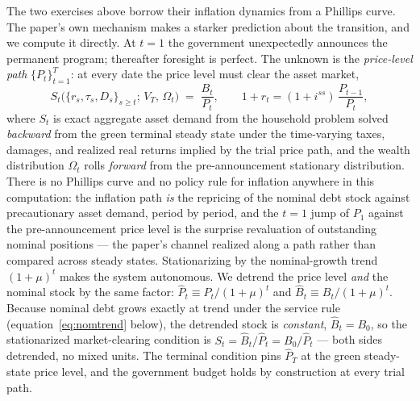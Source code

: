 \documentclass[12pt]{article}
\newcommand{\Sfun}{S}
\begin{document}
The two exercises above borrow their inflation dynamics from a Phillips
curve. The paper's own mechanism makes a starker prediction about the
transition, and we compute it directly. At $t=1$ the government unexpectedly announces
the permanent program; thereafter foresight is perfect. The unknown is
the \emph{price-level path} $\{P_t\}_{t=1}^{T}$: at every date the price
level must clear the asset market,
\[
S_t\bigl(\{r_s, \tau_s, D_s\}_{s \ge t};\, V_T,\, \Omega_t\bigr)
\;=\; \frac{B_t}{P_t}, \qquad
1 + r_t = (1+i^{ss})\,\frac{P_{t-1}}{P_t},
\]
where $S_t$ is exact aggregate asset demand from the household problem
solved \emph{backward} from the green terminal steady state under the
time-varying taxes, damages, and realized real returns implied by the
trial price path, and the wealth distribution $\Omega_t$ rolls
\emph{forward} from the pre-announcement stationary distribution. There
is no Phillips curve and no policy rule for inflation anywhere in this
computation: the inflation path \emph{is} the repricing of the nominal
debt stock against precautionary asset demand, period by period, and the
$t=1$ jump of $P_1$ against the pre-announcement price level is the
surprise revaluation of outstanding nominal positions --- the paper's
channel realized along a path rather than compared across steady states.
Stationarizing by the nominal-growth trend $(1+\mu)^t$ makes the system
autonomous. We detrend the price level \emph{and} the nominal stock by the
same factor: $\hat P_t\equiv P_t/(1+\mu)^t$ and $\hat B_t\equiv
B_t/(1+\mu)^t$. Because nominal debt grows exactly at trend under the service
rule (equation~\eqref{eq:nomtrend} below), the detrended stock is
\emph{constant}, $\hat B_t=B_0$, so the stationarized market-clearing condition
is $\Sfun_t=\hat B_t/\hat P_t=B_0/\hat P_t$ --- both sides detrended, no mixed
units. The terminal condition pins $\hat{P}_T$ at the green
steady-state price level, and the government budget holds by construction
at every trial path.
\end{document}
